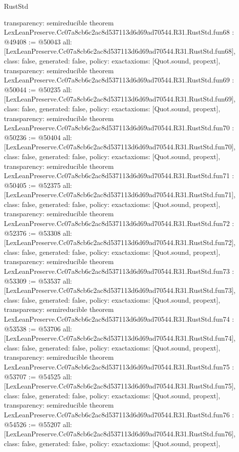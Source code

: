 \begin{lexlean}{RustStd}
\begin{coremodule}
{  transparency: semireducible
}
theorem LexLeanPreserve.Cc07a8cb6c2ac8d537113d6d69ad70544.R31.RustStd.fun68 : @49408 := @50043 {
  all: [LexLeanPreserve.Cc07a8cb6c2ac8d537113d6d69ad70544.R31.RustStd.fun68],
  class: false,
  generated: false,
  policy: exact{axioms: [Quot.sound, propext]},
  transparency: semireducible
}
theorem LexLeanPreserve.Cc07a8cb6c2ac8d537113d6d69ad70544.R31.RustStd.fun69 : @50044 := @50235 {
  all: [LexLeanPreserve.Cc07a8cb6c2ac8d537113d6d69ad70544.R31.RustStd.fun69],
  class: false,
  generated: false,
  policy: exact{axioms: [Quot.sound, propext]},
  transparency: semireducible
}
theorem LexLeanPreserve.Cc07a8cb6c2ac8d537113d6d69ad70544.R31.RustStd.fun70 : @50236 := @50404 {
  all: [LexLeanPreserve.Cc07a8cb6c2ac8d537113d6d69ad70544.R31.RustStd.fun70],
  class: false,
  generated: false,
  policy: exact{axioms: [Quot.sound, propext]},
  transparency: semireducible
}
theorem LexLeanPreserve.Cc07a8cb6c2ac8d537113d6d69ad70544.R31.RustStd.fun71 : @50405 := @52375 {
  all: [LexLeanPreserve.Cc07a8cb6c2ac8d537113d6d69ad70544.R31.RustStd.fun71],
  class: false,
  generated: false,
  policy: exact{axioms: [Quot.sound, propext]},
  transparency: semireducible
}
theorem LexLeanPreserve.Cc07a8cb6c2ac8d537113d6d69ad70544.R31.RustStd.fun72 : @52376 := @53308 {
  all: [LexLeanPreserve.Cc07a8cb6c2ac8d537113d6d69ad70544.R31.RustStd.fun72],
  class: false,
  generated: false,
  policy: exact{axioms: [Quot.sound, propext]},
  transparency: semireducible
}
theorem LexLeanPreserve.Cc07a8cb6c2ac8d537113d6d69ad70544.R31.RustStd.fun73 : @53309 := @53537 {
  all: [LexLeanPreserve.Cc07a8cb6c2ac8d537113d6d69ad70544.R31.RustStd.fun73],
  class: false,
  generated: false,
  policy: exact{axioms: [Quot.sound, propext]},
  transparency: semireducible
}
theorem LexLeanPreserve.Cc07a8cb6c2ac8d537113d6d69ad70544.R31.RustStd.fun74 : @53538 := @53706 {
  all: [LexLeanPreserve.Cc07a8cb6c2ac8d537113d6d69ad70544.R31.RustStd.fun74],
  class: false,
  generated: false,
  policy: exact{axioms: [Quot.sound, propext]},
  transparency: semireducible
}
theorem LexLeanPreserve.Cc07a8cb6c2ac8d537113d6d69ad70544.R31.RustStd.fun75 : @53707 := @54525 {
  all: [LexLeanPreserve.Cc07a8cb6c2ac8d537113d6d69ad70544.R31.RustStd.fun75],
  class: false,
  generated: false,
  policy: exact{axioms: [Quot.sound, propext]},
  transparency: semireducible
}
theorem LexLeanPreserve.Cc07a8cb6c2ac8d537113d6d69ad70544.R31.RustStd.fun76 : @54526 := @55207 {
  all: [LexLeanPreserve.Cc07a8cb6c2ac8d537113d6d69ad70544.R31.RustStd.fun76],
  class: false,
  generated: false,
  policy: exact{axioms: [Quot.sound, propext]},
}
\end{coremodule}
\end{lexlean}
